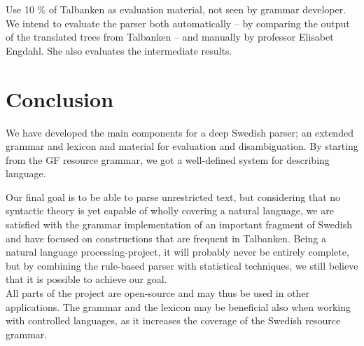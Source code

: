 \documentclass[10pt, a4paper]{article}
\begin{document}
%

Use 10 \% of Talbanken as evaluation material, not seen by grammar developer.
We intend to evaluate the parser both automatically -- by comparing the output of
the translated trees from Talbanken -- and manually by professor Elisabet Engdahl.
She also evaluates the intermediate results.

\section{Conclusion}
We have developed the main components
for a deep Swedish parser; an extended grammar and lexicon and material for
evaluation and disambiguation.
By starting from the GF resource grammar, we got a well-defined system for
describing language. 

Our final goal is to be able to parse unrestricted text, but considering that
no syntactic theory is yet capable
of wholly covering a natural language, we are satisfied with 
the grammar implementation of an important fragment of Swedish and have
focused on constructions that are frequent in Talbanken. 
Being a natural language processing-project, it will probably never be
entirely complete, but by combining the rule-based parser with statistical
techniques, 
we still believe that it is possible to achieve our goal. 
\\

All parts of the project are open-source and may thus be used in other applications.
The grammar and the lexicon may be beneficial also when working with controlled languages,
as it increases the coverage of the Swedish resource grammar.
\end{document}
